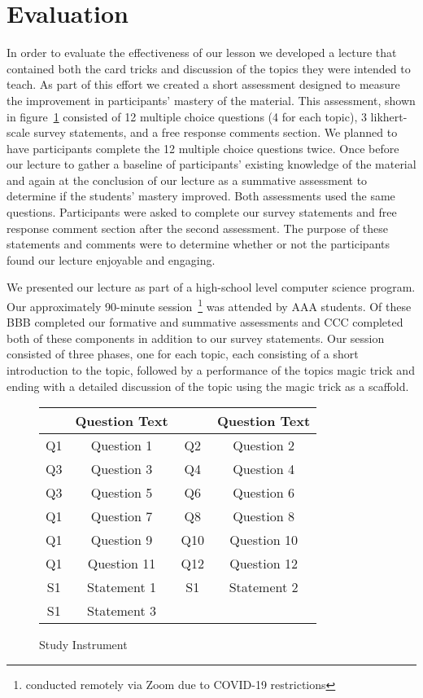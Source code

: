 \section{Evaluation}
\label{SEC:evaluation}

In order to evaluate the effectiveness of our lesson we developed a lecture
that contained both the card tricks and discussion of the topics they were
intended to teach.  As part of this effort we created a short assessment
designed to measure the improvement in participants' mastery of the material.
This assessment, shown in figure~\ref{fig:assessment}
consisted of 12 multiple choice questions (4 for each topic),
3 likhert-scale survey statements,
and a free response comments section.
We planned to have participants complete the 12 multiple choice questions twice.
Once before our lecture to gather a baseline of
participants' existing knowledge of the material and again at the conclusion of our
lecture as a summative assessment to determine if the students' mastery
improved.  Both assessments used the same questions.
Participants were asked to complete our survey statements and
free response comment section after the second assessment.  The purpose of
these statements and comments were to determine whether or not the
participants found our lecture enjoyable and engaging.

We presented our lecture as part of a high-school level computer science
program.  Our approximately 90-minute session~\footnote{conducted remotely
via Zoom due to COVID-19 restrictions} was attended by AAA students.  Of
these BBB completed our formative and summative assessments and CCC
completed both of these components in addition to our survey statements.
Our session consisted of three phases, one for each topic, each consisting
of a short introduction to the topic,
followed by a performance of the topics magic trick
and ending with a detailed discussion of the topic
using the magic trick as a scaffold.





\begin{figure}[H]
  \begin{tabular}{c | c | c | c}
    & Question Text  &     & Question Text\\
    \hline
    Q1 & Question 1  & Q2  & Question 2   \\
    Q3 & Question 3  & Q4  & Question 4   \\
    Q3 & Question 5  & Q6  & Question 6   \\
    Q1 & Question 7  & Q8  & Question 8   \\
    Q1 & Question 9  & Q10 & Question 10  \\
    Q1 & Question 11 & Q12 & Question 12  \\
    \hline
    S1 & Statement 1 & S1  & Statement 2  \\
    S1 & Statement 3 &     &              \\
  \end{tabular}
  \caption{Study Instrument}
  \label{fig:assessment}
\end{figure}

